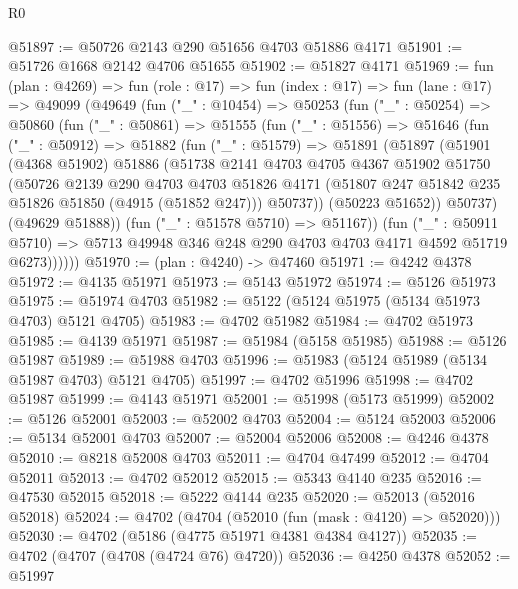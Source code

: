 \begin{lexlean}{R0}
\begin{coremodule}
@51897 := @50726 @2143 @290 @51656 @4703 @51886 @4171
@51901 := @51726 @1668 @2142 @4706 @51655
@51902 := @51827 @4171
@51969 := fun (plan : @4269) =>
  fun (role : @17) =>
  fun (index : @17) =>
  fun (lane : @17) =>
  @49099
    (@49649
      (fun ("_" : @10454) =>
      @50253
        (fun ("_" : @50254) =>
        @50860
          (fun ("_" : @50861) =>
          @51555
            (fun ("_" : @51556) =>
            @51646
              (fun ("_" : @50912) =>
              @51882
                (fun ("_" : @51579) =>
                @51891
                  (@51897
                    (@51901
                      (@4368 @51902)
                      @51886
                      (@51738
                        @2141
                        @4703
                        @4705
                        @4367
                        @51902
                        @51750
                        (@50726
                          @2139
                          @290
                          @4703
                          @4703
                          @51826
                          @4171
                          (@51807 @247 @51842 @235 @51826 @51850 (@4915 (@51852 @247)))
                          @50737))
                      (@50223 @51652))
                    @50737)
                  (@49629 @51888))
                (fun ("_" : @51578 @5710) => @51167))
              (fun ("_" : @50911 @5710) =>
              @5713 @49948 @346 @248 @290 @4703 @4703 @4171 @4592 @51719 @6273))))))
@51970 := (plan : @4240) -> @47460
@51971 := @4242 @4378
@51972 := @4135 @51971
@51973 := @5143 @51972
@51974 := @5126 @51973
@51975 := @51974 @4703
@51982 := @5122 (@5124 @51975 (@5134 @51973 @4703) @5121 @4705)
@51983 := @4702 @51982
@51984 := @4702 @51973
@51985 := @4139 @51971
@51987 := @51984 (@5158 @51985)
@51988 := @5126 @51987
@51989 := @51988 @4703
@51996 := @51983 (@5124 @51989 (@5134 @51987 @4703) @5121 @4705)
@51997 := @4702 @51996
@51998 := @4702 @51987
@51999 := @4143 @51971
@52001 := @51998 (@5173 @51999)
@52002 := @5126 @52001
@52003 := @52002 @4703
@52004 := @5124 @52003
@52006 := @5134 @52001 @4703
@52007 := @52004 @52006
@52008 := @4246 @4378
@52010 := @8218 @52008 @4703
@52011 := @4704 @47499
@52012 := @4704 @52011
@52013 := @4702 @52012
@52015 := @5343 @4140 @235
@52016 := @47530 @52015
@52018 := @5222 @4144 @235
@52020 := @52013 (@52016 @52018)
@52024 := @4702 (@4704 (@52010 (fun (mask : @4120) => @52020)))
@52030 := @4702 (@5186 (@4775 @51971 @4381 @4384 @4127))
@52035 := @4702 (@4707 (@4708 (@4724 @76) @4720))
@52036 := @4250 @4378
@52052 := @51997

\end{coremodule}
\end{lexlean}
